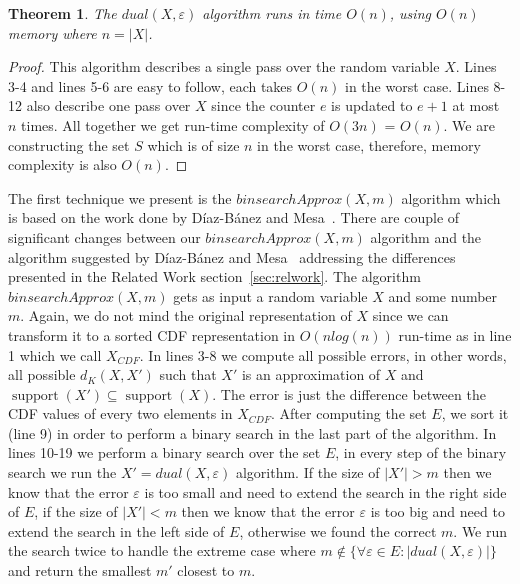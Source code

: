 \documentclass[letterpaper]{article} %
\newtheorem{theorem}[thm]{Theorem}
\DeclareMathOperator{\support}{support}
\begin{document}

\begin{theorem}\label{the:complexityDual}
	The $dual(X,\varepsilon)$ algorithm runs in time $O(n)$, using $O(n)$ memory where $n=|X|$.
\end{theorem}
\begin{proof}
	This algorithm describes a single pass over the random variable $X$. Lines 3-4 and lines 5-6 are easy to follow, each takes $O(n)$ in the worst case. Lines 8-12 also describe one pass over $X$ since the counter $e$ is updated to $e+1$ at most $n$ times. All together we get run-time complexity of $O(3n)$ = $O(n)$. We are constructing the set $S$ which is of size $n$ in the worst case, therefore, memory complexity is also $O(n)$. 
\end{proof}

The first technique we present is the $binsearchApprox(X,m)$ algorithm which is based on the work done by D{\'i}az-B{\'a}nez and Mesa~\cite{diaz2001fitting}. There are couple of significant changes between our $binsearchApprox(X,m)$ algorithm and the algorithm suggested by D{\'i}az-B{\'a}nez and Mesa~\cite{diaz2001fitting} addressing the differences presented in the Related Work section~\ref{sec:relwork}. The algorithm $binsearchApprox(X,m)$ gets as input a random variable $X$ and some number $m$. Again, we do not mind the original representation of $X$ since we can transform it to a sorted CDF representation in $O(nlog(n))$ run-time as in line 1 which we call $X_{CDF}$. In lines 3-8 we compute all possible errors, in other words, all possible $d_{K}(X,X')$ such that $X'$ is an approximation of $X$ and $\support(X') \subseteq \support(X)$. The error is just the difference between the CDF values of every two elements in $X_{CDF}$. After computing the set $E$, we sort it (line 9) in order to perform a binary search in the last part of the algorithm. In lines 10-19 we perform a binary search over the set $E$, in every step of the binary search we run the $X' = dual(X,\varepsilon)$ algorithm. If the size of $|X'|>m$ then we know that the error $\varepsilon$ is too small and need to extend the search in the right side of $E$, if the size of $|X'|<m$ then we know that the error $\varepsilon$ is too big and need to extend the search in the left side of $E$, otherwise we found the correct $m$. We run the search twice to handle the extreme case where $m \notin \{\forall \varepsilon\in E: |dual(X,\varepsilon)|\}$ and return the smallest $m'$ closest to $m$.
 
\end{document}
